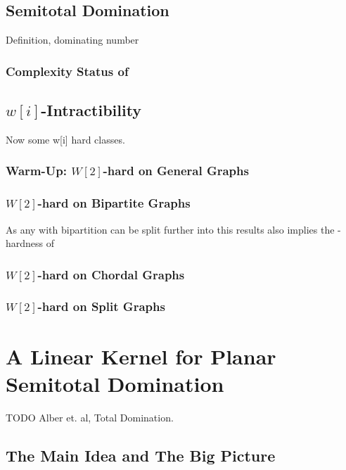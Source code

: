 \section{Semitotal Domination}

\sdom

Definition, dominating number

\subsection*{Complexity Status of \sdom}

\section{\hmath $w[i]$-Intractibility}

Now some  w[i] hard classes. 

\subsection{Warm-Up: \hmath $W[2]$-hard on General Graphs}

\subsection{\hmath $W[2]$-hard on Bipartite Graphs}

As any \bg with bipartition can be split further into \rpg this results also implies the \wone-hardness of \rpg

\subsection{\hmath $W[2]$-hard on Chordal Graphs}

\subsection{\hmath $W[2]$-hard on Split Graphs}

\chapter{A Linear Kernel for Planar Semitotal Domination}

TODO Alber et. al, Total Domination. 

\section{The Main Idea and The Big Picture}



